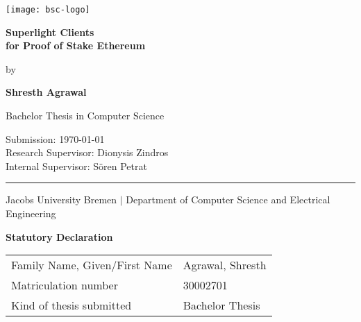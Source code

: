 \documentclass[a4paper,11pt,oneside]{article}
\newcommand{\mylastname}{Agrawal}
\newcommand{\myfirstname}{Shresth}
\newcommand{\mynumber}{30002701}
\newcommand{\myname}{\myfirstname{} \mylastname{}}
\newcommand{\mytitle}{Superlight Clients\\ for Proof of Stake Ethereum}
\newcommand{\myresearchsupervisor}{Dionysis Zindros}
\newcommand{\myinternalsupervisor}{Sören Petrat}
\theoremstyle{definition}
\begin{document}

  \thispagestyle{empty}

  \begin{flushright}
    \texttt{[image: bsc-logo]}
  \end{flushright}
  \vspace*{40mm}
  \begin{center}
    \huge
    \textbf{\mytitle}
  \end{center}
  \vspace*{4mm}
  \begin{center}
   \Large by
  \end{center}
  \vspace*{4mm}
  \begin{center}
    \LARGE
    \textbf{\myname}
  \end{center}
  \vspace*{20mm}
  \begin{center}
    \Large
    Bachelor Thesis in Computer Science
  \end{center}
  \vfill
  \begin{flushleft}
    \large
    Submission: \today \hfill \\
    Research Supervisor: \myresearchsupervisor \\
    Internal Supervisor: \myinternalsupervisor \\
    \rule{\textwidth}{1pt}
  \end{flushleft}
  \begin{center}
    Jacobs University Bremen $|$ Department of Computer Science and Electrical Engineering
  \end{center}

  \newpage
  \thispagestyle{empty}

  \begin{center}
    \Large \textbf{Statutory Declaration}
    \vspace*{8mm}
  \end{center}

  \begin{center}
    \begin{tabular}{|l|p{85mm}|}
      \hline
      Family Name, Given/First Name & \mylastname, \myfirstname \\
      Matriculation number & \mynumber \\
      Kind of thesis submitted & Bachelor Thesis \\
      \hline
    \end{tabular}
    \vspace*{8mm}
  \end{center}
\end{document}
